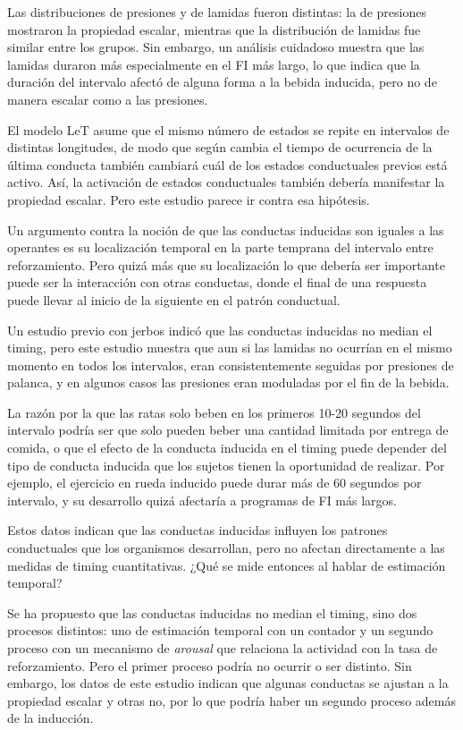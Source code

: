 \documentclass[a4paper,12pt]{article}
\begin{document}
Las distribuciones de presiones y de lamidas fueron distintas: la de presiones mostraron la propiedad escalar, mientras que la distribución de lamidas fue similar entre los grupos. Sin embargo, un análisis cuidadoso muestra que las lamidas duraron más especialmente en el FI más largo, lo que indica que la duración del intervalo afectó de alguna forma a la bebida inducida, pero no de manera escalar como a las presiones.

El modelo LeT asume que el mismo número de estados se repite en intervalos de distintas longitudes, de modo que según cambia el tiempo de ocurrencia de la última conducta también cambiará cuál de los estados conductuales previos está activo. Así, la activación de estados conductuales también debería manifestar la propiedad escalar. Pero este estudio parece ir contra esa hipótesis.

Un argumento contra la noción de que las conductas inducidas son iguales a las operantes es su localización temporal en la parte temprana del intervalo entre reforzamiento. Pero quizá más que su localización lo que debería ser importante puede ser la interacción con otras conductas, donde el final de una respuesta puede llevar al inicio de la siguiente en el patrón conductual.

Un estudio previo con jerbos indicó que las conductas inducidas no median el timing, pero este estudio muestra que aun si las lamidas no ocurrían en el mismo momento en todos los intervalos, eran consistentemente seguidas por presiones de palanca, y en algunos casos las presiones eran moduladas por el fin de la bebida.

La razón por la que las ratas solo beben en los primeros 10-20 segundos del intervalo podría ser que solo pueden beber una cantidad limitada por entrega de comida, o que el efecto de la conducta inducida en el timing puede depender del tipo de conducta inducida que los sujetos tienen la oportunidad de realizar. Por ejemplo, el ejercicio en rueda inducido puede durar más de 60 segundos por intervalo, y su desarrollo quizá afectaría a programas de FI más largos.

Estos datos indican que las conductas inducidas influyen los patrones conductuales que los organismos desarrollan, pero no afectan directamente a las medidas de timing cuantitativas. ¿Qué se mide entonces al hablar de estimación temporal?

Se ha propuesto que las conductas inducidas no median el timing, sino dos procesos distintos: uno de estimación temporal con un contador y un segundo proceso con un mecanismo de {\itshape arousal} que relaciona la actividad con la tasa de reforzamiento. Pero el primer proceso podría no ocurrir o ser distinto. Sin embargo, los datos de este estudio indican que algunas conductas se ajustan a la propiedad escalar y otras no, por lo que podría haber un segundo proceso además de la inducción.
\end{document}
